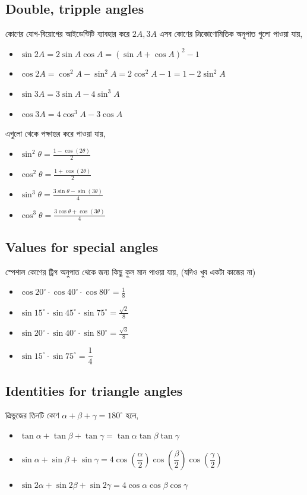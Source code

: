 \documentclass[12pt]{article}
\begin{document}
\subsection{Double, tripple angles}
কোণের যোগ-বিয়োগের আইডেন্টিটি ব্যাবহার করে $2A, 3A$ এসব কোণের ত্রিকোণোমিতিক অনুপাত গুলো পাওয়া যায়, 
\begin{itemize}
    \item $\sin 2A = 2\sin A \cos A =(\sin A +\cos A )^{2}-1$
    \item $\cos 2A = \cos^2 A - \sin^2 A = 2\cos^2 A - 1 = 1- 2\sin^2A$
    \item $\sin 3A = 3\sin A - 4\sin^3 A$
    \item $\cos 3A = 4\cos^3 A - 3\cos A$
\end{itemize}
এগুলো থেকে পক্ষান্তর করে পাওয়া যায়, 
\begin{itemize}
    \item ${\displaystyle \sin ^{2}\theta ={\frac {1-\cos(2\theta )}{2}}}$
    \item ${\displaystyle \cos ^{2}\theta ={\frac {1+\cos(2\theta )}{2}}}$
    \item ${\displaystyle \sin ^{3}\theta ={\frac {3\sin \theta -\sin(3\theta )}{4}}}$
    \item ${\displaystyle \cos ^{3}\theta ={\frac {3\cos \theta +\cos(3\theta )}{4}}}$
\end{itemize}
\subsection{Values for special angles}
স্পেশাল কোণের ট্রিগ অনুপাত থেকে জন্য কিছু কুল মান পাওয়া যায়, (যদিও খুব একটা কাজের না)
\begin{itemize}
    \item ${\displaystyle \cos 20^{\circ }\cdot \cos 40^{\circ }\cdot \cos 80^{\circ }={\frac {1}{8}}}$
    \item ${\displaystyle {\sin 15^{\circ }\cdot \sin 45^{\circ }\cdot \sin 75^{\circ }={\frac {\sqrt {2}}{8}}}}$
    \item ${\displaystyle \sin 20^{\circ }\cdot \sin 40^{\circ }\cdot \sin 80^{\circ }={\frac {\sqrt {3}}{8}}}$
    \item $\sin 15^{\circ }\cdot \sin 75^{\circ } ={\dfrac {1}{4}}$
\end{itemize}
\subsection{Identities for triangle angles}
ত্রিভুজের তিনটি কোণ $ \displaystyle \alpha +\beta +\gamma =180^{\circ }$ হলে, 
\begin{itemize}
    \item $\tan\alpha + \tan\beta + \tan\gamma = \tan\alpha \tan\beta \tan\gamma$
    \item $\sin\alpha + \sin\beta + \sin\gamma = 4\cos \left(\dfrac{\alpha}{2} \right)\cos \left(\dfrac{\beta}{2} \right)\cos \left(\dfrac{\gamma}{2} \right)$
    \item $\sin 2\alpha + \sin 2\beta + \sin 2\gamma = 4\cos \alpha \cos \beta \cos \gamma$
\end{itemize}
\end{document}
